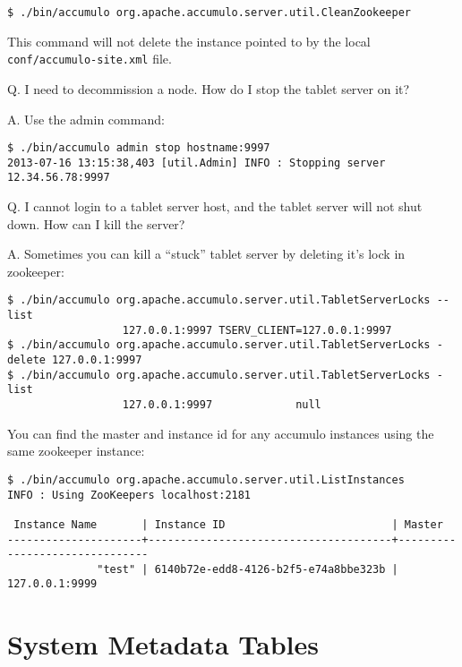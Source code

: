 \small
\begin{verbatim}
$ ./bin/accumulo org.apache.accumulo.server.util.CleanZookeeper
\end{verbatim}
\normalsize

This command will not delete the instance pointed to by the local \texttt{conf/accumulo-site.xml} file.

Q. I need to decommission a node.  How do I stop the tablet server on it?

A. Use the admin command:

\small
\begin{verbatim}
$ ./bin/accumulo admin stop hostname:9997
2013-07-16 13:15:38,403 [util.Admin] INFO : Stopping server 12.34.56.78:9997
\end{verbatim}
\normalsize

Q. I cannot login to a tablet server host, and the tablet server will not shut down.  How can I kill the server?

A. Sometimes you can kill a ``stuck'' tablet server by deleting it's lock in zookeeper:

\small
\begin{verbatim}
$ ./bin/accumulo org.apache.accumulo.server.util.TabletServerLocks --list
                  127.0.0.1:9997 TSERV_CLIENT=127.0.0.1:9997
$ ./bin/accumulo org.apache.accumulo.server.util.TabletServerLocks -delete 127.0.0.1:9997
$ ./bin/accumulo org.apache.accumulo.server.util.TabletServerLocks -list
                  127.0.0.1:9997             null
\end{verbatim}
\normalsize

You can find the master and instance id for any accumulo instances using the same zookeeper instance:

\small
\begin{verbatim}
$ ./bin/accumulo org.apache.accumulo.server.util.ListInstances
INFO : Using ZooKeepers localhost:2181

 Instance Name       | Instance ID                          | Master                        
---------------------+--------------------------------------+-------------------------------
              "test" | 6140b72e-edd8-4126-b2f5-e74a8bbe323b |                127.0.0.1:9999
\end{verbatim}
\normalsize

\section{System Metadata Tables}
\label{sec:metadata}

